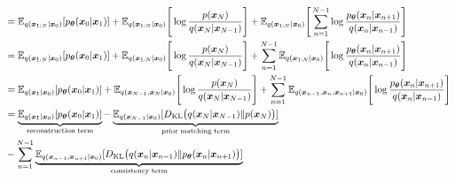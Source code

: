 \documentclass[14pt, a4paper]{article}
\numberwithin{equation}{section}
\numberwithin{figure}{section}
\numberwithin{dl}{section}
\numberwithin{md}{section}
\numberwithin{bd}{section}
\numberwithin{dn}{section}
\numberwithin{hq}{section}
\begin{document}
\begin{equation*}
\begin{aligned}
            &= \mathbb{E}_{q(\boldsymbol{x}_{1:N} \vert \boldsymbol{x}_0)} \lbrack p_{\boldsymbol{\theta}} (\boldsymbol{x}_0 \vert \boldsymbol{x}_1) \rbrack + \mathbb{E}_{q(\boldsymbol{x}_{1:N} \vert \boldsymbol{x}_0)} \Bigg \lbrack \log \dfrac{p(\boldsymbol{x}_N)}{q(\boldsymbol{x}_N \vert \boldsymbol{x}_{N-1})} \Bigg \rbrack + \mathbb{E}_{q(\boldsymbol{x}_{1:N} \vert \boldsymbol{x}_0)} \Bigg \lbrack \sum_{n=1}^{N-1} \log \dfrac{p_{\boldsymbol{\theta}} (\boldsymbol{x}_{n} \vert \boldsymbol{x}_{n+1})}{q(\boldsymbol{x}_n \vert \boldsymbol{x}_{n-1})} \Bigg \rbrack \\
            &= \mathbb{E}_{q(\boldsymbol{x}_{1:N} \vert \boldsymbol{x}_0)} \lbrack p_{\boldsymbol{\theta}} (\boldsymbol{x}_0 \vert \boldsymbol{x}_1) \rbrack + \mathbb{E}_{q(\boldsymbol{x}_{1:N} \vert \boldsymbol{x}_0)} \Bigg \lbrack \log \dfrac{p(\boldsymbol{x}_N)}{q(\boldsymbol{x}_N \vert \boldsymbol{x}_{N-1})} \Bigg \rbrack + \sum_{n=1}^{N-1} \mathbb{E}_{q(\boldsymbol{x}_{1:N} \vert \boldsymbol{x}_0)} \Bigg \lbrack \log \dfrac{p_{\boldsymbol{\theta}} (\boldsymbol{x}_{n} \vert \boldsymbol{x}_{n+1})}{q(\boldsymbol{x}_n \vert \boldsymbol{x}_{n-1})} \Bigg \rbrack \\
            &= \mathbb{E}_{q(\boldsymbol{x}_{1} \vert \boldsymbol{x}_0)} \lbrack p_{\boldsymbol{\theta}} (\boldsymbol{x}_0 \vert \boldsymbol{x}_1) \rbrack + \mathbb{E}_{q(\boldsymbol{x}_{N-1}, \boldsymbol{x}_{N} \vert \boldsymbol{x}_0)} \Bigg \lbrack \log \dfrac{p(\boldsymbol{x}_N)}{q(\boldsymbol{x}_N \vert \boldsymbol{x}_{N-1})} \Bigg \rbrack + \sum_{n=1}^{N-1} \mathbb{E}_{q(\boldsymbol{x}_{n-1}, \boldsymbol{x}_n, \boldsymbol{x}_{n+1} \vert \boldsymbol{x}_0)} \Bigg \lbrack \log \dfrac{p_{\boldsymbol{\theta}} (\boldsymbol{x}_{n} \vert \boldsymbol{x}_{n+1})}{q(\boldsymbol{x}_n \vert \boldsymbol{x}_{n-1})} \Bigg \rbrack \\
            &= \underbrace{\mathbb{E}_{q(\boldsymbol{x}_{1} \vert \boldsymbol{x}_0)} \lbrack p_{\boldsymbol{\theta}} (\boldsymbol{x}_0 \vert \boldsymbol{x}_1) \rbrack}_{\mathrm{reconstruction \thickspace term}} - \underbrace{\mathbb{E}_{q(\boldsymbol{x}_{N-1} \vert \boldsymbol{x}_0)} \lbrack D_{\mathrm{KL}} \big( q(\boldsymbol{x}_N \vert \boldsymbol{x}_{N-1}) \Vert p(\boldsymbol{x}_N) \big) \rbrack}_{\mathrm{prior \thickspace matching \thickspace term}} \\ &- \sum_{n=1}^{N-1} \underbrace{\mathbb{E}_{q(\boldsymbol{x}_{n-1}, \boldsymbol{x}_{n+1} \vert \boldsymbol{x}_0)} \lbrack D_{\mathrm{KL}} \big( q(\boldsymbol{x}_n \vert \boldsymbol{x}_{n-1}) \Vert p_{\boldsymbol{\theta}} (\boldsymbol{x}_n \vert \boldsymbol{x}_{n+1}) \big) \rbrack}_{\mathrm{consistency \thickspace term}}
        \end{aligned}
    \end{equation*}
\end{document}
